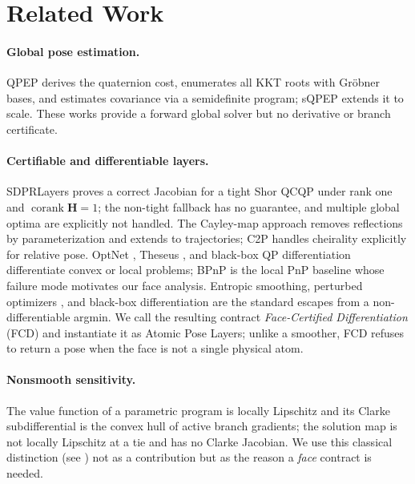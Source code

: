 \documentclass[conference]{IEEEtran}
\newcommand{\corank}{\operatorname{corank}}
\newcommand{\bH}{\bm{H}}
\begin{document}
\section{Related Work}
\paragraph{Global pose estimation.} QPEP \cite{wu2022qpep} derives the quaternion cost, enumerates all KKT roots with Gr\"obner bases, and estimates covariance via a semidefinite program; sQPEP \cite{xue2025sqpep} extends it to scale. These works provide a forward global solver but no derivative or branch certificate.

\paragraph{Certifiable and differentiable layers.} SDPRLayers \cite{holmes2025sdpr} proves a correct Jacobian for a tight Shor QCQP under rank one and $\corank\bH=1$; the non-tight fallback has no guarantee, and multiple global optima are explicitly not handled. The Cayley-map approach \cite{barfoot2025cayley} removes reflections by parameterization and extends to trajectories; C2P \cite{tirado2024c2p} handles cheirality explicitly for relative pose. OptNet \cite{amos2017optnet}, Theseus \cite{pineda2022theseus}, and black-box QP differentiation \cite{magoon2025dqp} differentiate convex or local problems; BPnP \cite{chen2020bpnp} is the local PnP baseline whose failure mode motivates our face analysis. Entropic smoothing, perturbed optimizers \cite{berthet2020perturbed}, and black-box differentiation \cite{vlastelica2020blackbox} are the standard escapes from a non-differentiable argmin. We call the resulting contract \emph{Face-Certified Differentiation} (FCD) and instantiate it as Atomic Pose Layers; unlike a smoother, FCD refuses to return a pose when the face is not a single physical atom.

\paragraph{Nonsmooth sensitivity.} The value function of a parametric program is locally Lipschitz and its Clarke subdifferential is the convex hull of active branch gradients; the solution map is not locally Lipschitz at a tie and has no Clarke Jacobian. We use this classical distinction (see \cite{clarke1983,luo1996,jongen2004}) not as a contribution but as the reason a \emph{face} contract is needed.
\end{document}
